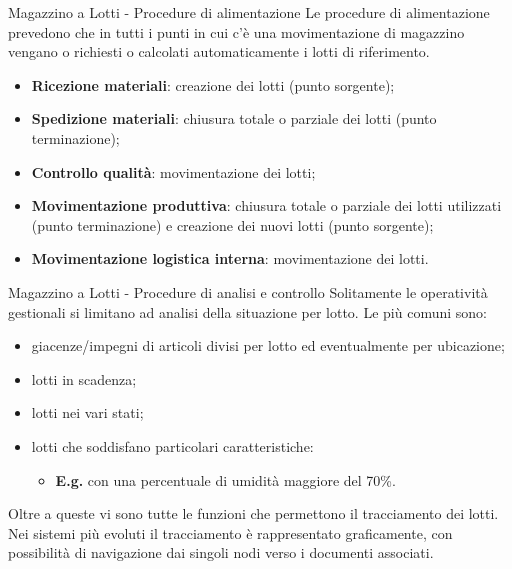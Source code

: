 \documentclass{beamer}
\begin{document}
\begin{frame}{Magazzino a Lotti - Procedure di alimentazione}
    Le procedure di alimentazione prevedono che in tutti i punti in cui c'è una movimentazione di magazzino vengano o richiesti o calcolati automaticamente i lotti di riferimento.
    \begin{itemize}
        \item \textbf{Ricezione materiali}: creazione dei lotti (punto sorgente);
        \item \textbf{Spedizione materiali}: chiusura totale o parziale dei lotti (punto terminazione);
        \item \textbf{Controllo qualità}: movimentazione dei lotti;
        \item \textbf{Movimentazione produttiva}: chiusura totale o parziale dei lotti utilizzati (punto terminazione) e creazione dei nuovi lotti (punto sorgente);
        \item \textbf{Movimentazione logistica interna}: movimentazione dei lotti.
    \end{itemize}
\end{frame}

\begin{frame}{Magazzino a Lotti - Procedure di analisi e controllo}
    Solitamente le operatività gestionali si limitano ad analisi della situazione per lotto. Le più comuni sono:
    \begin{itemize}
        \item giacenze/impegni di articoli divisi per lotto ed eventualmente per ubicazione;
        \item lotti in scadenza;
        \item lotti nei vari stati;
        \item lotti che soddisfano particolari caratteristiche:
        \begin{itemize}
            \item \textbf{E.g.} con una percentuale di umidità maggiore del 70\%.
        \end{itemize}
    \end{itemize}
    Oltre a queste vi sono tutte le funzioni che permettono il tracciamento dei lotti. Nei sistemi più evoluti il tracciamento è rappresentato graficamente, con possibilità di navigazione dai singoli nodi verso i documenti associati.
\end{frame}
\end{document}
